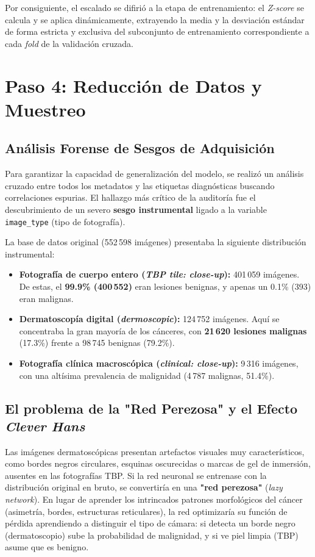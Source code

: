 Por consiguiente, el escalado se difirió a la etapa de entrenamiento: el \textit{Z-score} se calcula y se aplica dinámicamente, extrayendo la media y la desviación estándar de forma estricta y exclusiva del subconjunto de entrenamiento correspondiente a cada \textit{fold} de la validación cruzada.

\section{Paso 4: Reducción de Datos y Muestreo}

\subsection{Análisis Forense de Sesgos de Adquisición}
Para garantizar la capacidad de generalización del modelo, se realizó un análisis cruzado entre todos los metadatos y las etiquetas diagnósticas buscando correlaciones espurias. El hallazgo más crítico de la auditoría fue el descubrimiento de un severo \textbf{sesgo instrumental} ligado a la variable \texttt{image\_type} (tipo de fotografía). 

La base de datos original (552\,598 imágenes) presentaba la siguiente distribución instrumental:
\begin{itemize}
	\item \textbf{Fotografía de cuerpo entero (\textit{TBP tile: close-up}):} 401\,059 imágenes. De estas, el \textbf{99.9\% (400\,552)} eran lesiones benignas, y apenas un 0.1\% (393) eran malignas.
	\item \textbf{Dermatoscopía digital (\textit{dermoscopic}):} 124\,752 imágenes. Aquí se concentraba la gran mayoría de los cánceres, con \textbf{21\,620 lesiones malignas} (17.3\%) frente a 98\,745 benignas (79.2\%).
	\item \textbf{Fotografía clínica macroscópica (\textit{clinical: close-up}):} 9\,316 imágenes, con una altísima prevalencia de malignidad (4\,787 malignas, 51.4\%).
\end{itemize}

\subsection{El problema de la "Red Perezosa" y el Efecto \textit{Clever Hans}}
Las imágenes dermatoscópicas presentan artefactos visuales muy característicos, como bordes negros circulares, esquinas oscurecidas o marcas de gel de inmersión, ausentes en las fotografías TBP. Si la red neuronal se entrenase con la distribución original en bruto, se convertiría en una \textbf{"red perezosa"} (\textit{lazy network}). En lugar de aprender los intrincados patrones morfológicos del cáncer (asimetría, bordes, estructuras reticulares), la red optimizaría su función de pérdida aprendiendo a distinguir el tipo de cámara: si detecta un borde negro (dermatoscopio) sube la probabilidad de malignidad, y si ve piel limpia (TBP) asume que es benigno.

